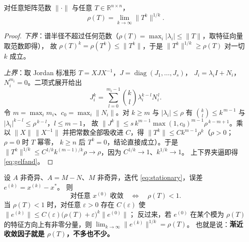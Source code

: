 \begin{lemma}[Gelfand 公式]
\label{lem:gelfand}
对任意矩阵范数 $\|\cdot\|$ 与任意 $T\in\mathbb R^{n\times n}$，
\begin{equation}
  \rho(T)=\lim_{k\to\infty}\|T^k\|^{1/k}.
  \label{eq:gelfand}
\end{equation}
\end{lemma}

\begin{proof}
\emph{下界}：谱半径不超过任何范数（$\rho(T)=\max_i|\lambda_i|\le\|T\|$，取特征向量取范数即得），
故 $\rho(T)^k=\rho(T^k)\le\|T^k\|$，于是 $\|T^k\|^{1/k}\ge\rho(T)$ 对一切 $k$ 成立。

\emph{上界}：取 Jordan 标准形 $T=XJX^{-1}$，$J=\operatorname{diag}(J_1,\dots,J_s)$，
$J_i=\lambda_iI+N_i$，$N_i^{m_i}=0$。二项式展开给出
\begin{equation}
  J_i^k=\sum_{l=0}^{m_i-1}\binom{k}{l}\lambda_i^{k-l}N_i^{\,l}.
\end{equation}
令 $m=\max_im_i$、$c_0=\max_i\|N_i\|$。对 $k\ge m$ 与 $|\lambda_i|\le\rho$ 有
$\binom{k}{l}\le k^{\,m-1}$ 与 $|\lambda_i|^{k-l}\le\rho^{\,k-l}$，$l\le m-1$，
故 $\|J^k\|\le s\,k^{m-1}\max(1,c_0)^{m-1}\rho^{\,k-m+1}$。乘以 $\|X\|\,\|X^{-1}\|$
并把常数全部吸收进 $C$，得 $\|T^k\|\le Ck^{m-1}\rho^k$（$\rho>0$；$\rho=0$ 时 $T$ 幂零，
$k\ge n$ 后 $T^k=0$，结论直接成立）。于是
$\|T^k\|^{1/k}\le C^{1/k}k^{(m-1)/k}\rho\to\rho$，因为 $C^{1/k}\to1$、$k^{1/k}\to1$。
上下界夹逼即得 \eqref{eq:gelfand}。
\end{proof}

\begin{theorem}[定常迭代收敛判据]
\label{thm:stationary}
设 $A$ 非奇异、$A=M-N$、$M$ 非奇异，迭代 \eqref{eq:stationary}，误差 $e^{(k)}=x^{(k)}-x^\ast$。
则
\begin{equation}
  \text{对任意 }x^{(0)}\text{ 收敛}\quad\iff\quad\rho(T)<1 .
\end{equation}
当 $\rho(T)<1$ 时，对任意 $\varepsilon>0$ 存在 $C(\varepsilon)$ 使
$\|e^{(k)}\|\le C(\varepsilon)\bigl(\rho(T)+\varepsilon\bigr)^k\|e^{(0)}\|$；
反过来，若 $e^{(0)}$ 在某个模为 $\rho(T)$ 的特征方向上有非零分量，则
$\lim_{k\to\infty}\|e^{(k)}\|^{1/k}=\rho(T)$。
也就是说：\textbf{渐近收敛因子就是 $\rho(T)$，不多也不少。}
\end{theorem}


